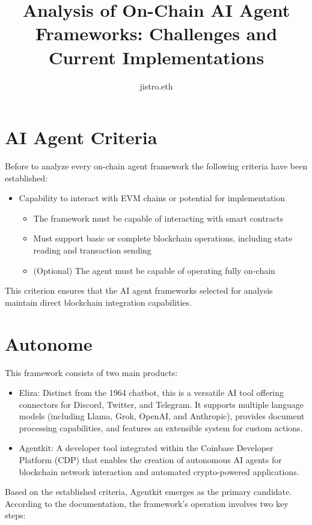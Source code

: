 \documentclass[fleqn,10pt]{olplainarticle}
\title{Analysis of On-Chain AI Agent Frameworks: Challenges and Current Implementations}
\author[1]{jistro.eth}
\begin{document}
\flushbottom
\maketitle
\thispagestyle{empty}

\tableofcontents

\section{AI Agent Criteria}
Before to analyze every on-chain agent framework the following criteria have been established:
\begin{itemize}[noitemsep]
	\item Capability to interact with EVM chains or potential for implementation
	\begin{itemize}[noitemsep, nolistsep]
		\item The framework must be capable of interacting with smart contracts
		\item Must support basic or complete blockchain operations, including state reading and transaction sending
		\item (Optional) The agent must be capable of operating fully on-chain
	\end{itemize}
\end{itemize}
This criterion ensures that the AI agent frameworks selected for analysis maintain direct blockchain integration capabilities.

\section{Autonome}
This framework consists of two main products:
\begin{itemize}[noitemsep]
	\item Eliza: Distinct from the 1964 chatbot, this is a versatile AI tool offering connectors for Discord, Twitter, and Telegram. It supports multiple language models (including Llama, Grok, OpenAI, and Anthropic), provides document processing capabilities, and features an extensible system for custom actions.
	
	\item Agentkit: A developer tool integrated within the Coinbase Developer Platform (CDP) that enables the creation of autonomous AI agents for blockchain network interaction and automated crypto-powered applications.
\end{itemize}

Based on the established criteria, Agentkit emerges as the primary candidate. According to the documentation, the framework's operation involves two key steps:
\end{document}
